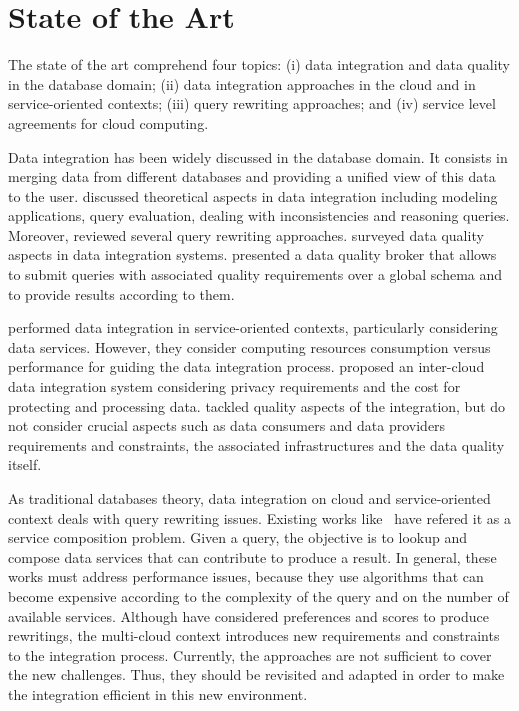 \section{State of the Art}

The state of the art comprehend four topics: 
(i) data integration and data quality in the database domain; 
(ii) data integration approaches in the cloud and in service-oriented contexts; 
(iii) query rewriting approaches; and 
(iv) service level agreements for cloud computing.

Data integration has been widely discussed in the database domain.
It consists in merging data from different databases and providing a unified view of this data to the user.
\cite{Lenzerini:2002} discussed theoretical aspects in data integration including modeling applications, query evaluation, dealing with inconsistencies and reasoning queries.
Moreover, \cite{Halevy:2001} reviewed several query rewriting approaches. 
\cite{Batini2006} surveyed data quality aspects in data integration systems. 
\cite{Scannapieco:2004} presented a data quality broker that allows to submit queries with associated quality requirements over a global schema and to provide results according to them.

\cite{Correndo2010,ElSheikh2013} performed data integration in service-oriented contexts, particularly considering data services. However, they  consider computing resources consumption versus performance for guiding the data integration process. 
\cite{Tian2010} proposed an inter-cloud data integration system considering privacy requirements and the cost for protecting and processing data. 
\cite{Scannapieco:2004,Tian2010,YauY08} tackled quality aspects of the integration, but do not consider crucial aspects such as data consumers and data providers requirements and constraints, the associated infrastructures and the data quality itself. %

As traditional databases theory, data integration on cloud and service-oriented context deals with query rewriting issues. Existing works like~\cite{ba2014,Barhamgi2010,Benouaret2011,Umberto} have refered it as a service composition problem. Given a query, the objective is to lookup and compose data services that can contribute to produce a result. In general, these works must address performance issues, because they use algorithms that can become expensive according to the complexity of the query and on the number of available services. Although \cite{ba2014,Benouaret2011} have considered preferences and scores to produce rewritings, the multi-cloud context introduces new requirements and constraints to the integration process. Currently, the approaches are not sufficient to cover the new challenges. Thus, they should be revisited and adapted in order to make the integration efficient in this new environment. 

